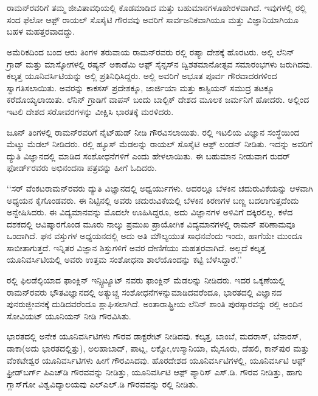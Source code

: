 
\chapter{}


ರಾಮನ್‍ರವರಿಗೆ ತಮ್ಮ ಜೀವಿತಾವಧಿಯಲ್ಲಿ ಕೊಡಮಾಡಿದ ಮತ್ತು ಬಹುಮಾನಗಳೂ\break ಹೇರಳವಾಗಿದೆ. ಇವುಗಳಲ್ಲಿ  ರಲ್ಲಿ ಸಂದ ಫೆಲೋ ಆಫ಼್ ರಾಯಲ್ ಸೊಸೈಟಿ ಗೌರವವು ಅವರಿಗೆ ಸಾರ್ವಜನಿಕವಾಗಿಯೂ ಮತ್ತು ವಿಜ್ಞಾನಿಯಾಗಿಯೂ ಬಹಳ ಮಹತ್ತರವಾದದ್ದು.

ಅಮೆರಿಕದಿಂದ ಬಂದ ಆರು ತಿಂಗಳ ತರುವಾಯ ರಾಮನ್‌ರವರು  ರಲ್ಲಿ ರಷ್ಯಾ ದೇಶಕ್ಕೆ ಹೊರಟರು. ಅಲ್ಲಿ ಲೆನಿನ್ ಗ್ರಾಡ್ ಮತ್ತು ಮಾಸ್ಕೋಗಳಲ್ಲಿ ರಷ್ಯನ್ ಅಕಾಡೆಮಿ ಆಫ಼್ ಸೈನ್ಸಸ್‌ನ ದ್ವಿಶತಮಾನೋತ್ಸವ ಸಮಾರಂಭಗಳು ಜರುಗಿದವು. ಕಲ್ಕತ್ತ ಯೂನಿವರ್ಸಿಟಿಯನ್ನು ಅಲ್ಲಿ ಪ್ರತಿನಿಧಿಸಿದ್ದರು. ಅಲ್ಲಿ ಅವರಿಗೆ ಅಭೂತ ಪೂರ್ವ ಗೌರವಾದರಗಳಿಂದ ಸ್ವಾಗತಿಸಲಾಯಿತು. ಅವರನ್ನು ಕಾಕಸಸ್ ಪ್ರದೇಶಕ್ಕೂ, ಜಾರ್ಜಿಯಾ ಮತ್ತು ಕಾಸ್ಟಿಯನ್ ಸಮುದ್ರ ತಟಕ್ಕೂ ಕರೆದೊಯ್ಯ\-ಲಾಯಿತು. ಲೆನಿನ್ ಗ್ರಾಡಿಗೆ ವಾಪಸ್ ಬಂದು ಬಾಲ್ಟಿಕ್ ದೇಶದ ಮೂಲಕ ಜರ್ಮನಿಗೆ ಹೋದರು. ಅಲ್ಲಿಂದ ಇಟಲಿ ದೇಶದ ಸರೋವರಗಳನ್ನು ವೀಕ್ಷಿಸಿ ಭಾರತಕ್ಕೆ ಮರಳಿದರು. 

 ಜೂನ್ ತಿಂಗಳಲ್ಲಿ ರಾಮನ್‍ರವರಿಗೆ ನೈಟ್‌ಹುಡ್ ನೀಡಿ ಗೌರವಿಸಲಾಯಿತು.  ರಲ್ಲಿ ಇಟಲಿಯ ವಿಜ್ಞಾನ ಸಂಸ್ಥೆಯಿಂದ ಮೆಟ್ಯು ಮೆಡಲ್ ನೀಡಿದರು.  ರಲ್ಲಿ ಹ್ಯೂಸ್ ಮೆಡಲನ್ನು ರಾಯಲ್ ಸೊಸೈಟಿ ಆಫ಼್ ಲಂಡನ್ ನೀಡಿತು. ಇದನ್ನು ಅವರಿಗೆ ದ್ಯುತಿ ವಿಜ್ಞಾನದಲ್ಲಿ ಮಾಡಿದ ಸಂಶೋಧನೆಗಳಿಗೆ ಎಂದು ಹೇಳಲಾಯಿತು. ಈ ಬಹುಮಾನ ನೀಡುವಾಗ ರುದರ್ ಫೋರ್ಡ್‌ರವರು ಅಭಿನಂದನಾ ಪತ್ರವನ್ನು ಹೀಗೆ ಓದಿದರು.

‘‘ಸರ್ ವೆಂಕಟರಾಮನ್‌ರವರು ದ್ಯುತಿ ವಿಜ್ಞಾನದಲ್ಲಿ ಅಧ್ವರ್ಯುಗಳು. ಅದರಲ್ಲೂ ಬೆಳಕಿನ ಚದುರುವಿಕೆಯನ್ನು ಆಳವಾಗಿ ಅಧ್ಯಯನ ಕೈಗೊಂಡವರು. ಈ ನಿಟ್ಟಿನಲ್ಲಿ ಅವರು ಚದುರುವಿಕೆಯಲ್ಲಿ ಬೆಳಕಿನ ಕಿರಣಗಳ ಬಣ್ಣ ಬದಲಾಗುತ್ತದೆಂದು ಅನ್ವೇಷಿಸಿದರು. ಈ ವಿದ್ಯಮಾನವನ್ನು ಮೊದಲೇ ಊಹಿಸಿದ್ದರೂ, ಅದು ವಿಜ್ಞಾನಗಳ ಅಳಿವಿಗೆ ದಕ್ಕಿರಲಿಲ್ಲ. ಕಳೆದ ದಶಕದಲ್ಲಿ ಆವಿಷ್ಕಾರಗೊಂಡ ಮೂರು ನಾಲ್ಕು ಪ್ರಮುಖ ಪ್ರಾಯೋಗಿಕ ವಿದ್ಯಮಾನಗಳಲ್ಲಿ ರಾಮನ್ ಪರಿಣಾಮವೂ ಒಂದಾಗಿದೆ. ಘನ ವಸ್ತುಗಳ ಅಧ್ಯಯನದಲ್ಲಿ ಅದು ಅತಿ ಮೌಲ್ಯಯುತ ಸಾಧನವೆಂದು ಇಂದು, ಹಾಗೆಯೇ ಮುಂದೂ ಸಾಬೀತಾಗುತ್ತದೆ. ಇನ್ನಿತರ ವಿಜ್ಞಾನ ಶಿಸ್ತುಗಳಿಗೆ ಅವರ ದೇಣಿಗೆಯು ಮಹತ್ತರವಾಗಿದೆ. ಅಲ್ಲದೆ ಕಲ್ಕತ್ತ ಯೂನಿವರ್ಸಿಟಿಯಲ್ಲಿ ಅವರು ಉತ್ತಮ ಸಂಶೋಧನಾ ಶಾಲೆಯೊಂದನ್ನು ಕಟ್ಟಿ ಬೆಳೆಸಿದ್ದಾರೆ.’’

ರಲ್ಲಿ ಫಿಲಡೆಲ್ಫಿಯಾದ ಫಾಂಕ್ಲಿನ್ ಇನ್ಸ್ಟಿಟ್ಯೂಟ್ ನವರು ಫಾಂಕ್ಲಿನ್ ಮೆಡಲನ್ನು ನೀಡಿದರು. ಇದರ ಒಕ್ಕಣೆಯಲ್ಲಿ ರಾಮನ್‌ರವರು ಭೌತವಿಜ್ಞಾನದಲ್ಲಿ ಅತ್ಯುಚ್ಚ ಸಂಶೋಧನೆಗಳನ್ನು\break ಮಾಡಿದವರೆಂದೂ, ಭಾರತದಲ್ಲಿ ವಿಜ್ಞಾನದ ಪುನರುಜ್ಜೀವನಕ್ಕೆ ದುಡಿದವರೆಂದೂ ಶ್ಲಾಘಿಸಲಾಗಿದೆ. ಅಂತಾರಾಷ್ಟ್ರೀಯ ಲೆನಿನ್ ಶಾಂತಿ ಪುರಸ್ಕಾರವನ್ನು  ರಲ್ಲಿ ಅಂದಿನ ಸೋವಿಯಟ್ ಯೂನಿಯನ್ ನೀಡಿ ಗೌರವಿಸಿತು.

ಭಾರತದಲ್ಲಿ ಅನೇಕ ಯೂನಿವರ್ಸಿಟಿಗಳು ಗೌರವ ಡಾಕ್ಟರೇಟ್ ನೀಡಿದವು. ಕಲ್ಕತ್ತ, ಬಾಂಬೆ, ಮದರಾಸ್, ಬೆನಾರಸ್, ಡಾಕಾ(ಅದು ಭಾರತದಲ್ಲಿತ್ತು), ಅಲಹಾಬಾದ್, ಪಾಟ್ನ, ಲಕ್ನೋ,\break ಉಸ್ಮಾನಿಯಾ, ಮೈಸೂರು, ದೆಹಲಿ, ಕಾನ್‌ಪುರ ಮತ್ತು ವೆಂಕಟೇಶ್ವರ ಯೂನಿವರ್ಸಿಟಿಗಳು ಹೀಗೆ ಗೌರವಿಸಿದವು. ಹೊರದೇಶದ ಯೂನಿವರ್ಸಿಟಿಗಳಲ್ಲಿ, ಯೂನಿವರ್ಸಿಟಿ ಆಫ಼್ ಫ್ರೀಡ್‌ಬರ್ಗ್ ಪಿಎಚ್‌ಡಿ ಗೌರವವನ್ನು ನೀಡಿತ್ತು, ಯೂನಿವರ್ಸಿಟಿ ಆಫ಼್ ಪ್ಯಾರಿಸ್ ಎಸ್.ಡಿ. ಗೌರವ ನೀಡಿತ್ತು, ಹಾಗು ಗ್ಲಾಸ್‌ಗೋ ವಿಶ್ವವಿದ್ಯಾಲಯವು ಎಲ್ಎಲ್.ಡಿ ಗೌರವವನ್ನು  ರಲ್ಲಿ ನೀಡಿತು. 

